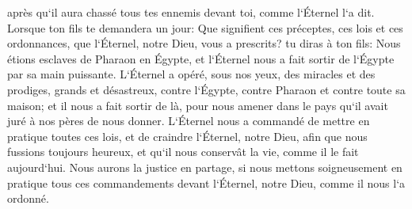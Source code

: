 \verse après qu`il aura chassé tous tes ennemis devant toi, comme l`Éternel l`a dit. 
\verse Lorsque ton fils te demandera un jour: Que signifient ces préceptes, ces lois et ces ordonnances, que l`Éternel, notre Dieu, vous a prescrits? 
\verse tu diras à ton fils: Nous étions esclaves de Pharaon en Égypte, et l`Éternel nous a fait sortir de l`Égypte par sa main puissante. 
\verse L`Éternel a opéré, sous nos yeux, des miracles et des prodiges, grands et désastreux, contre l`Égypte, contre Pharaon et contre toute sa maison; 
\verse et il nous a fait sortir de là, pour nous amener dans le pays qu`il avait juré à nos pères de nous donner. 
\verse L`Éternel nous a commandé de mettre en pratique toutes ces lois, et de craindre l`Éternel, notre Dieu, afin que nous fussions toujours heureux, et qu`il nous conservât la vie, comme il le fait aujourd`hui. 
\verse Nous aurons la justice en partage, si nous mettons soigneusement en pratique tous ces commandements devant l`Éternel, notre Dieu, comme il nous l`a ordonné. 

